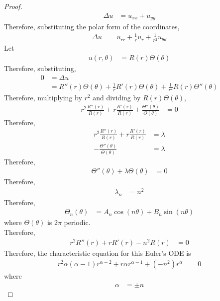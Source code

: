 \documentclass[titlepage, fleqn, a4paper, 12pt, twoside]{article}
\theoremstyle{definition}
\theoremstyle{theorem}
\begin{document}
\begin{proof}
	\begin{align*}
		\Delta u & = u_{x x} + u_{y y}
	\end{align*}
	Therefore, substituting the polar form of the coordinates,
	\begin{align*}
		\Delta u & = u_{r r} + \frac{1}{r} u_r + \frac{1}{r^2} u_{\theta \theta}
	\end{align*}
	Let
	\begin{align*}
		u(r,\theta) & = R(r) \Theta(\theta)
	\end{align*}
	Therefore, substituting,
	\begin{align*}
		0 & = \Delta u \\
                  & = R''(r) \Theta(\theta) + \frac{1}{r} R'(r) \Theta(\theta) + \frac{1}{r^2} R(r) \Theta''(\theta)
	\end{align*}
	Therefore, multiplying by $r^2$ and dividing by $R(r) \Theta(\theta)$,
	\begin{align*}
		r^2 \frac{R''(r)}{R(r)} + r \frac{R'(r)}{R(r)} + \frac{\Theta''(\theta)}{\Theta(\theta)} & = 0
	\end{align*}
	Therefore,
	\begin{align*}
		r^2 \frac{R''(r)}{R(r)} + r \frac{R'(r)}{R(r)} & = \lambda \\
		-\frac{\Theta''(\theta)}{\Theta(\theta)}       & = \lambda
	\end{align*}
	Therefore,
	\begin{align*}
		\Theta''(\theta) + \lambda \Theta(\theta) & = 0
	\end{align*}
	Therefore,
	\begin{align*}
		\lambda_n & = n^2
	\end{align*}
	Therefore,
	\begin{align*}
		\Theta_n(\theta) & = A_n \cos(n \theta) + B_n \sin(n \theta)
	\end{align*}
	where $\Theta(\theta)$ is $2 \pi$ periodic.\\
	Therefore,
	\begin{align*}
		r^2 R''(r) + r R'(r) - n^2 R(r) & = 0
	\end{align*}
	Therefore, the characteristic equation for this Euler's ODE is
	\begin{align*}
		r^2 \alpha (\alpha - 1) r^{\alpha - 2} + r \alpha r^{\alpha - 1} + \left( -n^2 \right) r^{\alpha} & = 0
	\end{align*}
	where
	\begin{align*}
		\alpha & = \pm n
	\end{align*}

\end{proof}
\end{document}
